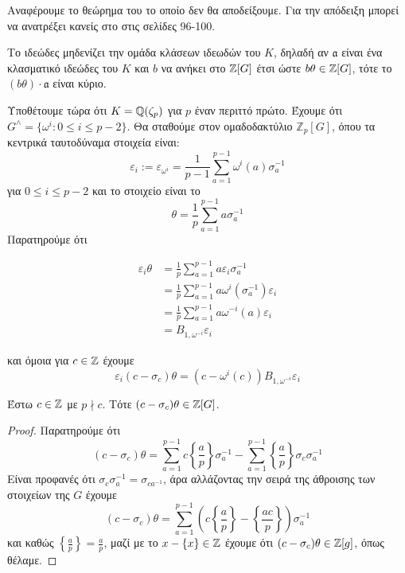 \noindent Αναφέρουμε το θεώρημα του  το οποίο δεν θα αποδείξουμε. 
Για την απόδειξη μπορεί να ανατρέξει κανείς στο \cite{Wash} στις σελίδες 96-100.

\begin{theorem}
	Το ιδεώδες  μηδενίζει την ομάδα κλάσεων ιδεωδών του $K$, δηλαδή αν $\mathfrak{a}$ είναι ένα κλασματικό ιδεώδες 
	του $K$ και $b$ να ανήκει στο $ \mathbb{Z}[G]$ έτσι ώστε $b\theta \in \mathbb{Z}[G]$, τότε το $(b\theta)\cdot \mathfrak{a}$ είναι κύριο.
\end{theorem}

\noindent Υποθέτουμε τώρα ότι $K=\mathbb{Q}(\zeta_p)$ για $p$ έναν περιττό πρώτο. Έχουμε ότι $G^\wedge =\{ \omega^i: 0 \leq i \leq p-2\}$. Θα σταθούμε στον ομαδοδακτύλιο $\mathbb{Z}_p[G]$, όπου τα κεντρικά ταυτοδύναμα στοιχεία είναι:
$$\varepsilon_i := \varepsilon_{\omega^i} = \frac{1}{p-1} \sum\limits_{a=1}^{p-1} \omega^i(a)\sigma_a^{-1}$$ για $0\leq i\leq p-2$ 
και το στοιχείο  είναι το
$$\theta = \frac1p \sum\limits_{a=1}^{p-1}a \sigma^{-1}_a$$ Παρατηρούμε ότι

\begin{align*}
	\varepsilon_i \theta &= \frac1p \sum\limits_{a=1}^{p-1}a\varepsilon_i \sigma^{-1}_a \\
	&= \frac1p \sum\limits_{a=1}^{p-1}a\omega^i (\sigma^{-1}_a)\varepsilon_i \\
	&= \frac1p \sum\limits_{a=1}^{p-1}a\omega^{-i}(a)\varepsilon_i \\ 
	&= B_{1,\omega^{-i}}\varepsilon_i
\end{align*}

\noindent και όμοια για $c \in \mathbb{Z}$ έχουμε
$$\varepsilon_i (c-\sigma_c)\theta = (c-\omega^i(c))B_{1,\omega^{-i}} \varepsilon_i$$

\begin{prop}
	Έστω $c \in \mathbb{Z}$ με $p\nmid c$. Τότε $(c-\sigma_c)\theta \in \mathbb{Z}[G]$.
\end{prop}
\begin{proof}
	Παρατηρούμε ότι
	$$(c-\sigma_c)\theta = \sum\limits_{a=1}^{p-1} c \left\{\frac{a}{p} \right\} \sigma^{-1}_a - \sum\limits_{a=1}^{p-1}\left\{\frac{a}{p}\right\} \sigma_c \sigma^{-1}_a$$
	Είναι προφανές ότι $\sigma_c \sigma^{-1}_a = \sigma_{ca^{-1}}$, άρα αλλάζοντας την σειρά της άθροισης των στοιχείων της $G$ έχουμε
	$$(c-\sigma_c)\theta = \sum\limits_{a=1}^{p-1}\left(c\left\{\frac{a}{p}\right\}-\left\{\frac{ac}{p}\right\}\right)\sigma^{-1}_a$$ και 
	καθώς $\left\{\frac{a}{p}\right\} = \frac{a}{p}$, μαζί με το $x -\{x\} \in \mathbb{Z}$ έχουμε ότι $(c-\sigma_c)\theta \in \mathbb{Z}[g]$, όπως θέλαμε.
\end{proof}

